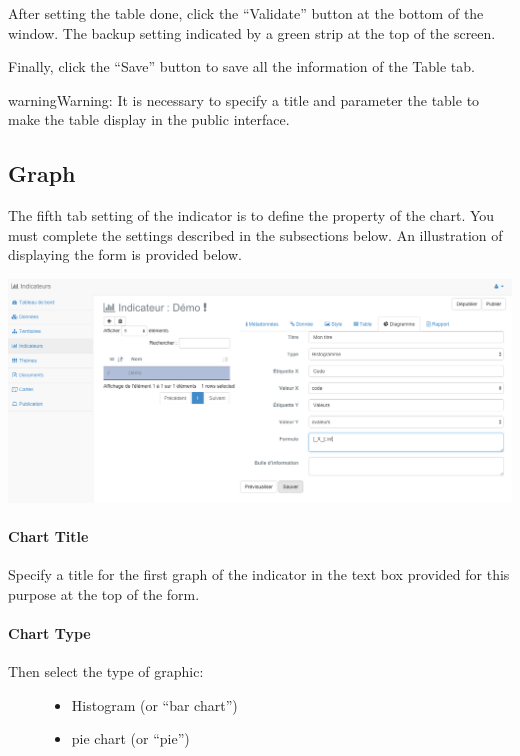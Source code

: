 \documentclass[letterpaper,10pt,english]{sphinxmanual}
\begin{document}
After setting the table done, click the ``Validate'' button at the bottom of the window. The backup setting indicated by a green strip at the top of the screen.

Finally, click the ``Save'' button to save all the information of the Table tab.

\begin{notice}{warning}{Warning:}
It is necessary to specify a title and parameter the table to make the table display in the public interface.
\end{notice}


\subsection{Graph}
\label{indicators/indicatorspanel:graphique}
The fifth tab setting of the indicator is to define the property of the chart. You must complete the settings described in the subsections below. An illustration of displaying the form is provided below.

\includegraphics[width=1.000\linewidth]{indicator-graph.png}
\paragraph{Chart Title}

Specify a title for the first graph of the indicator in the text box provided for this purpose at the top of the form.
\paragraph{Chart Type}
\begin{description}
\item[{Then select the type of graphic:}] \leavevmode\begin{itemize}
\item {} 
Histogram (or ``bar chart'')

\item {} 
pie chart (or ``pie'')

\end{itemize}

\end{description}
\end{document}
